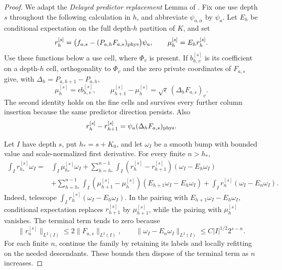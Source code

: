 \begin{proof}
We adapt the \emph{Delayed predictor replacement} Lemma of
\cite[Section~5]{H}.  Fix one use depth \(s\) throughout the
following calculation in \(h\), and abbreviate
\(\psi_{a,\alpha}\) by \(\psi_a\).  Let \(E_h\) be conditional
expectation on the full depth-\(h\) partition of \(K\), and set
\[
 r_h^{[s]}=\bigl(f_{a,s}-(P_{a,h}F_{a,s})_{\rm phys}\bigr)\psi_a,
 \qquad \mu_h^{[s]}=E_h r_h^{[s]}.
\]
Use these functions below a use cell, where \(\Phi_v\) is present.
If \(b_{h,v}^{[s]}\) is its coefficient on a depth-\(h\) cell,
orthogonality to \(\Phi_v\) and the zero private coordinates of
\(F_{a,s}\) give, with \(\Delta_h=P_{a,h+1}-P_{a,h}\),
\begin{equation}
 \mu_h^{[s]}=\epsilon b_{h,v}^{[s]},\qquad
 \mu_{h+1}^{[s]}-\mu_h^{[s]}
      =\sqrt\epsilon\,(\Delta_hF_{a,s})_v.                     \label{eq:hbase-predictor-moment}
\end{equation}
The second identity holds on the fine cells and survives every
further column insertion because the same predictor direction
persists.  Also
\[
 r_h^{[s]}-r_{h+1}^{[s]}
      =\psi_a(\Delta_hF_{a,s})_{\rm phys}.
\]

Let \(I\) have depth \(s\), put \(h_*=s+K_0\), and let \(\omega_I\)
be a smooth bump with bounded value and scale-normalized first
derivative.  For every finite \(n>h_*\),
\begin{align}
 \int_I r_{h_*}^{[s]}\omega_I
 ={}&\int_I\mu_{h_*}^{[s]}\omega_I
  +\sum_{h=h_*}^{n-1}\int_I
       (r_h^{[s]}-r_{h+1}^{[s]})(\omega_I-E_h\omega_I)
       \nonumber\\
 &+\sum_{h=h_*}^{n-1}\int_I
       (\mu_{h+1}^{[s]}-\mu_h^{[s]})
       (E_{h+1}\omega_I-E_h\omega_I)
  +\int_I r_n^{[s]}(\omega_I-E_n\omega_I).                    \label{eq:hbase-telescope}
\end{align}
Indeed, telescope
\(\int_I r_h^{[s]}(\omega_I-E_h\omega_I)\).  In the pairing with
\(E_{h+1}\omega_I-E_h\omega_I\), conditional expectation replaces
\(r_{h+1}^{[s]}\) by \(\mu_{h+1}^{[s]}\), while the pairing with
\(\mu_h^{[s]}\) vanishes.  The terminal term tends to zero because
\[
 \|r_n^{[s]}\|_{L^2(I)}\le2\|F_{a,s}\|_{L^2(I)},\qquad
 \|\omega_I-E_n\omega_I\|_{L^2(I)}
       \le C|I|^{1/2}2^{s-n}.
\]
For each finite \(n\), continue the family by retaining its labels
and locally refitting on the needed descendants.  These bounds then
dispose of the terminal term as \(n\) increases.


\end{proof}
